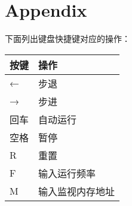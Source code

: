 \documentclass[12pt]{article}
\begin{document}
\section{Appendix}

下面列出键盘快捷键对应的操作：

\begin{table}[h]
\begin{tabular}{|l|l|}
\hline
{\bf 按键} & {\bf 操作} \\ \hline
←        & 步退       \\ \hline
→        & 步进       \\ \hline
回车       & 自动运行     \\ \hline
空格       & 暂停       \\ \hline
R        & 重置       \\ \hline
F        & 输入运行频率   \\ \hline
M        & 输入监视内存地址 \\ \hline
\end{tabular}
\end{table}
\end{document}
